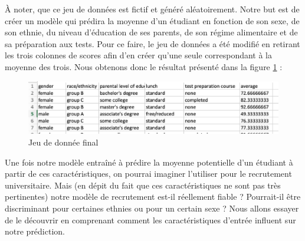 À noter, que ce jeu de données est fictif et généré aléatoirement. Notre but est de créer un modèle qui prédira la moyenne d’un étudiant en fonction de son sexe, de son ethnie, du niveau d’éducation de ses parents, de son régime alimentaire et de sa préparation aux tests. Pour ce faire, le jeu de données a été modifié en retirant les trois colonnes de scores afin d'en créer qu'une seule correspondant à la moyenne des trois. Nous obtenons donc le résultat présenté dans la figure \ref{studentsPerformanceDataSetModif} : 
\begin{figure}[h]
    \includegraphics[scale=1]{src_img/StudentsPerformanceDataSetModif.png}
    \caption{Jeu de donnée final}
    \label{studentsPerformanceDataSetModif}
\end{figure}
Une fois notre modèle entraîné à prédire la moyenne potentielle d'un étudiant à partir de ces caractéristiques, on pourrai imaginer l'utiliser pour le recrutement universitaire. Mais (en dépit du fait que ces caractéristiques ne sont pas très pertinentes) notre modèle de recrutement est-il réellement fiable ? Pourrait-il être discriminant pour certaines ethnies ou pour un certain sexe ? Nous allons essayer de le découvrir en comprenant comment les caractéristiques d'entrée influent sur notre prédiction.

